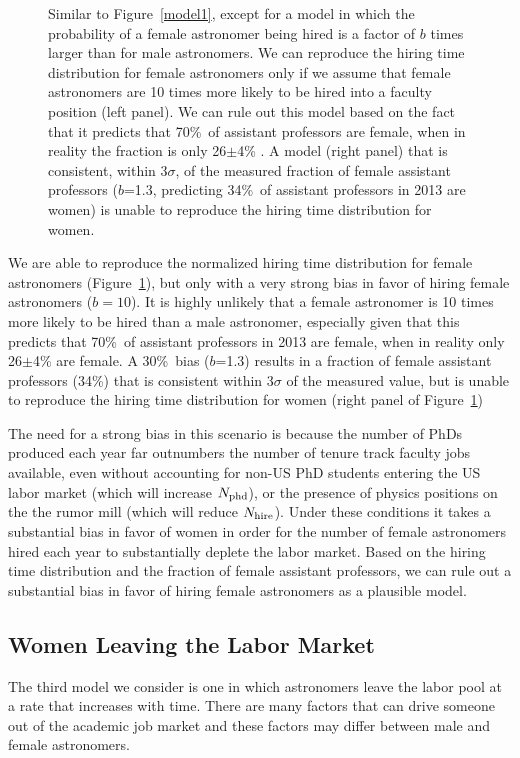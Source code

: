 \documentclass[modern]{aastex62}
\begin{document}
\begin{figure}[!hbt]
\caption{Similar to Figure~\ref{model1}, except for a model in which the probability of a female astronomer being hired is a factor of $b$ times larger than for male astronomers. We can reproduce the hiring time distribution for female astronomers only if we assume that female astronomers are 10 times more likely to be hired into a faculty position (left panel). We can rule out this model based on the fact that it predicts that 70\%\ of assistant professors are female, when in reality the fraction is only 26$\pm$4\% \citep{hug14}. A model (right panel) that is consistent, within 3$\sigma$, of the measured fraction of female assistant professors ($b$=1.3, predicting 34\%\ of assistant professors in 2013 are women) is unable to reproduce the hiring time distribution for women. \label{model2_b10}}
\end{figure}

We are able to reproduce the normalized hiring time distribution for female astronomers (Figure~\ref{model2_b10}), but only with a very strong bias in favor of hiring female astronomers ($b=10$). It is highly unlikely that a female astronomer is 10 times more likely to be hired than a male astronomer, especially given that this predicts that 70\%\ of assistant professors in 2013 are female, when in reality only 26$\pm$4\% are female. A 30\%\ bias ($b$=1.3) results in a fraction of female assistant professors (34\%) that is consistent within 3$\sigma$ of the measured value, but is unable to reproduce the hiring time distribution for women (right panel of Figure~\ref{model2_b10}) 

The need for a strong bias in this scenario is because the number of PhDs produced each year far outnumbers the number of tenure track faculty jobs available, even without accounting for non-US PhD students entering the US labor market (which will increase $N_{\rm phd}$), or the presence of physics positions on the the rumor mill (which will reduce $N_{\rm hire}$). Under these conditions it takes a substantial bias in favor of women in order for the number of female astronomers hired each year to substantially deplete the labor market. Based on the hiring time distribution and the fraction of female assistant professors, we can rule out a substantial bias in favor of hiring female astronomers as a plausible model. 

\subsection{Women Leaving the Labor Market}
The third model we consider is one in which astronomers leave the labor pool at a rate that increases with time. There are many factors that can drive someone out of the academic job market and these factors may differ between male and female astronomers.
\end{document}
